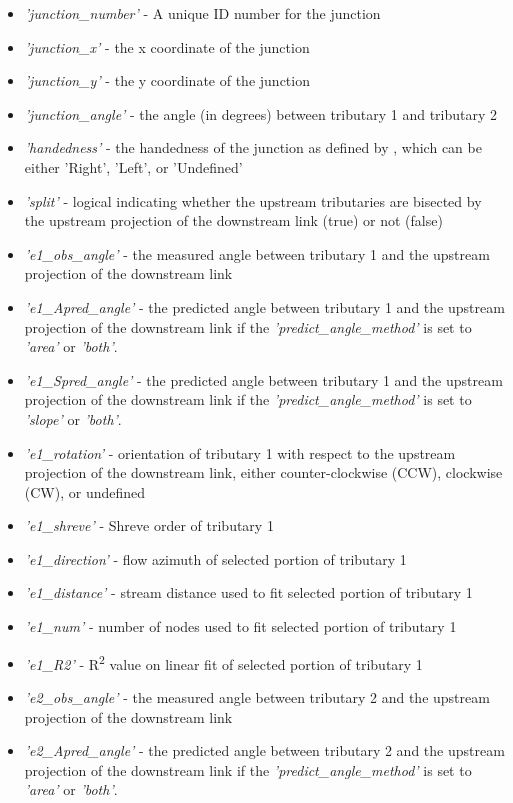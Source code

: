 \begin{itemize}
	\item \textit{'junction\_number'} - A unique ID number for the junction
	\item \textit{'junction\_x'} - the x coordinate of the junction
	\item \textit{'junction\_y'} - the y coordinate of the junction
	\item \textit{'junction\_angle'} - the angle (in degrees) between tributary 1 and tributary 2
	\item \textit{'handedness'} - the handedness of the junction as defined by \cite{James1969}, which can be either 'Right', 'Left', or 'Undefined'
	\item \textit{'split'} - logical indicating whether the upstream tributaries are bisected by the upstream projection of the downstream link (true) or not (false)
	\item \textit{'e1\_obs\_angle'} - the measured angle between tributary 1 and the upstream projection of the downstream link
	\item \textit{'e1\_Apred\_angle'} - the predicted angle between tributary 1 and the upstream projection of the downstream link if the \textit{'predict\_angle\_method'} is set to \textit{'area'} or \textit{'both'}.
	\item \textit{'e1\_Spred\_angle'} - the predicted angle between tributary 1 and the upstream projection of the downstream link if the \textit{'predict\_angle\_method'} is set to \textit{'slope'} or \textit{'both'}.
	\item \textit{'e1\_rotation'} - orientation of tributary 1 with respect to the upstream projection of the downstream link, either counter-clockwise (CCW), clockwise (CW), or undefined
	\item \textit{'e1\_shreve'} - Shreve order of tributary 1
	\item \textit{'e1\_direction'} - flow azimuth of selected portion of tributary 1
	\item \textit{'e1\_distance'} - stream distance used to fit selected portion of tributary 1
	\item \textit{'e1\_num'} - number of nodes used to fit selected portion of tributary 1
	\item \textit{'e1\_R2'} - R\textsuperscript{2} value on linear fit of selected portion of tributary 1
	\item \textit{'e2\_obs\_angle'} - the measured angle between tributary 2 and the upstream projection of the downstream link
	\item \textit{'e2\_Apred\_angle'} - the predicted angle between tributary 2 and the upstream projection of the downstream link if the \textit{'predict\_angle\_method'} is set to \textit{'area'} or \textit{'both'}.

\end{itemize}
